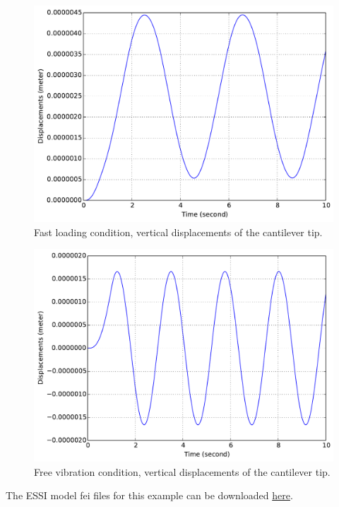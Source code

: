 \documentclass[fleqn,11pt]{article}
\begin{document}
\begin{figure}[!htb]
  \centering
  \includegraphics[width=12cm]{../Figure-files/_Chapter_Appendix_Illustrative_Examples/beam-mass-1element-fastLoading.pdf}
  \caption{Fast loading condition, vertical displacements of the cantilever tip.}
  \label{fig_beam-mass-fast}
\end{figure}

\begin{figure}[!htb]
  \centering
  \includegraphics[width=12cm]{../Figure-files/_Chapter_Appendix_Illustrative_Examples/beam-mass-1element-freeVibration.pdf}
  \caption{Free vibration condition, vertical displacements of the cantilever tip.}
  \label{fig_beam-mass-freevibr}
\end{figure}


The    ESSI   model   fei   files   for   this   example   can   be   downloaded
\href{https://github.com/BorisJeremic/Real-ESSI-Examples/blob/master/model_fei_file/beam_elastic_mass_dynamic/beam_elastic_mass_dynamic.tgz?raw=true}{here}.
\end{document}
